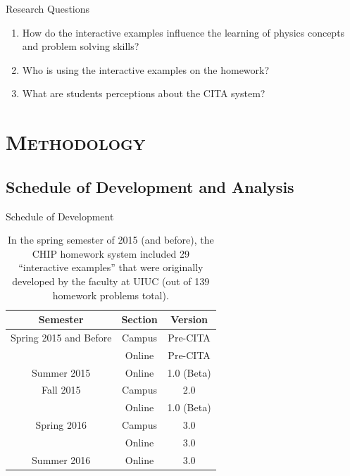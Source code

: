 \documentclass[xcolor=x11names,compress]{beamer}
\begin{document}
\begin{frame}{Research Questions}
	\begin{enumerate}
		\item How do the interactive examples influence the learning of physics concepts and problem solving skills?
		\vspace{5mm}
		\item Who is using the interactive examples on the homework?
		\vspace{5mm}
		\item What are students perceptions about the CITA system?
	\end{enumerate}
\end{frame}


\section{\scshape Methodology}

\subsection{Schedule of Development and Analysis}

\begin{frame}{Schedule of Development}
	\begin{table}[ht]
		\caption{In the spring semester of 2015 (and before), the CHIP homework system included 29 ``interactive examples'' that were originally developed by the faculty at UIUC (out of 139 homework problems total).}
		\begin{center}
			\begin{tabular}{|c|c|c|}
				\hline
				\textbf{Semester} & \textbf{Section} & \textbf{Version}\\
				\hline
				Spring 2015 and Before & Campus & Pre-CITA\\
				& Online & Pre-CITA\\
				\hline
				Summer 2015 & Online & 1.0 (Beta)\\
				\hline
				Fall 2015 & Campus & 2.0\\
				& Online & 1.0 (Beta)\\
				\hline
				Spring 2016 & Campus & 3.0\\
				& Online & 3.0\\
				\hline
				Summer 2016 & Online & 3.0\\
				\hline
			\end{tabular}
		\end{center}
		\label{tab:schedule}
	\end{table}
\end{frame}
\end{document}
